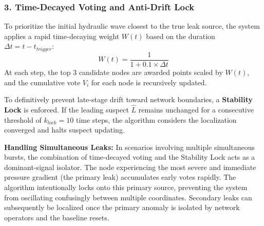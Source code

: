 \documentclass[final,5p,times,twocolumn,authoryear]{elsarticle}
\begin{document}
\subsubsection{3. Time-Decayed Voting and Anti-Drift Lock}
To prioritize the initial hydraulic wave closest to the true leak source, the system applies a rapid time-decaying weight $W(t)$ based on the duration $\Delta t = t - t_{trigger}$:
\begin{equation}
    W(t) = \frac{1}{1 + 0.1 \times \Delta t}
\end{equation}
At each step, the top 3 candidate nodes are awarded points scaled by $W(t)$, and the cumulative vote $V_i$ for each node is recursively updated.

To definitively prevent late-stage drift toward network boundaries, a \textbf{Stability Lock} is enforced. If the leading suspect $\hat{L}$ remains unchanged for a consecutive threshold of $k_{lock} = 10$ time steps, the algorithm considers the localization converged and halts suspect updating.

\textbf{Handling Simultaneous Leaks:} In scenarios involving multiple simultaneous bursts, the combination of time-decayed voting and the Stability Lock acts as a dominant-signal isolator. The node experiencing the most severe and immediate pressure gradient (the primary leak) accumulates early votes rapidly. The algorithm intentionally locks onto this primary source, preventing the system from oscillating confusingly between multiple coordinates. Secondary leaks can subsequently be localized once the primary anomaly is isolated by network operators and the baseline resets.
\end{document}
